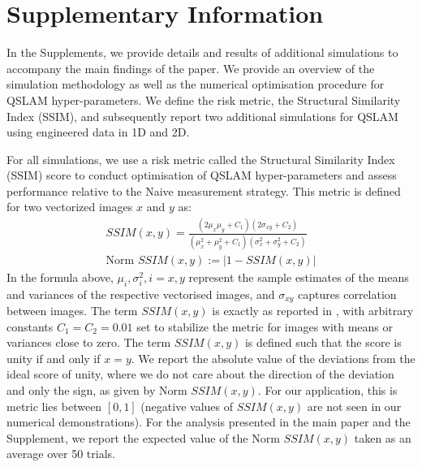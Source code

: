 \section{Supplementary Information}

In the Supplements, we provide details and results of additional simulations to accompany the main findings of the paper. We provide an overview of the simulation methodology as well as the numerical optimisation procedure for QSLAM hyper-parameters. We define the risk metric, the Structural Similarity Index (SSIM), and subsequently report two additional simulations for QSLAM using engineered data in 1D and 2D. 

For all simulations, we use a risk metric called the Structural Similarity Index (SSIM) score to conduct optimisation of QSLAM hyper-parameters and assess performance relative to the Naive measurement strategy. This metric is defined for two vectorized images $x$ and $y$ as:
\begin{align}
	SSIM(x, y) = \frac{(2 \mu_x\mu_y +C_1)(2\sigma_{xy} + C_2)}{(\mu_x^2  + \mu_y^2 + C_1 )(\sigma_x^2 + \sigma_y^2 + C_2)} \\
	\text{Norm } SSIM(x, y):= |1 - SSIM(x,y)|
\end{align} In the formula above, $\mu_i, \sigma_i^2, i = x,y$ represent the sample estimates of the means and variances of the respective vectorised images, and $\sigma_{xy}$ captures correlation between images. The term $SSIM(x,y)$ is exactly as reported in \cite{wang2004image}, with arbitrary constants $C_1=C_2=0.01$ set to stabilize the metric for images with means or variances close to zero.  The term $SSIM(x, y)$ is defined such that the score is unity if and only if $x=y$. We report the absolute value of the deviations from the ideal score of unity, where we do not care about the direction of the deviation and only the sign, as given by $\text{Norm } SSIM(x, y)$. For our application, this is metric lies between $[0, 1]$ (negative values of $SSIM(x, y)$ are not seen in our numerical demonstrations). For the analysis presented in the main paper and the Supplement, we report the expected value of the $\text{Norm } SSIM(x, y)$ taken as an average over 50 trials. 

